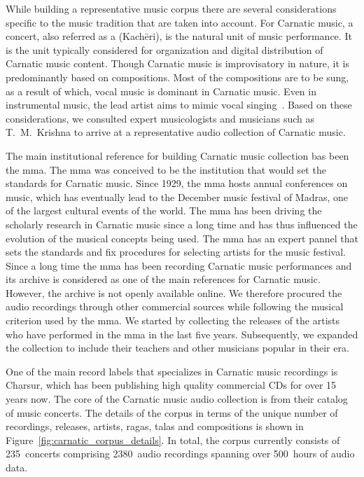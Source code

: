 While building a representative music corpus there are several considerations specific to the music tradition that are taken into account. For Carnatic music, a concert, also referred as a (Kach\={e}ri), is the natural unit of music performance. It is the unit typically considered for organization and digital distribution of Carnatic music content. Though Carnatic music is improvisatory in nature, it is predominantly based on compositions. Most of the compositions are to be sung, as a result of which, vocal music is dominant in Carnatic music. Even in instrumental music, the lead artist aims to mimic vocal singing~\citep{Viswanathan2004}. Based on these considerations, we consulted expert musicologists and musicians such as T.~M.~Krishna to arrive at a representative audio collection of Carnatic music.

The main institutional reference for building Carnatic music collection bas been the \gls{mma}. The \Gls{mma} was conceived to be the institution that would set the standards for Carnatic music. Since 1929, the \Gls{mma} hosts annual conferences on music, which has eventually lead to the December music festival of Madras, one of the largest cultural events of the world. The \gls{mma} has been driving the scholarly research in Carnatic music since a long time and has thus influenced the evolution of the musical concepts being used. The \gls{mma} has an expert pannel that sets the standards and fix procedures for selecting artists for the music festival. Since a long time the \gls{mma} has been recording Carnatic music performances and its archive is considered as one of the main references for Carnatic music. However, the archive is not openly available online. We therefore procured the audio recordings through other commercial sources while following the musical criterion used by the \gls{mma}. We started by collecting the releases of the artists who have performed in the \gls{mma} in the last five years. Subsequently, we expanded the collection to include their teachers and other musicians popular in their era. 

One of the main record labels that specializes in Carnatic music recordings is Charsur, which has been publishing high quality commercial CDs for over 15 years now. The core of the Carnatic music audio collection is from their catalog of music concerts. The details of the corpus in terms of the unique number of recordings, releases, artists, \glspl{raga}, \glspl{tala} and compositions is shown in Figure~\ref{fig:carnatic_corpus_details}. In total, the corpus currently consists of 235~concerts comprising 2380~audio recordings spanning over 500~hours of audio data.

